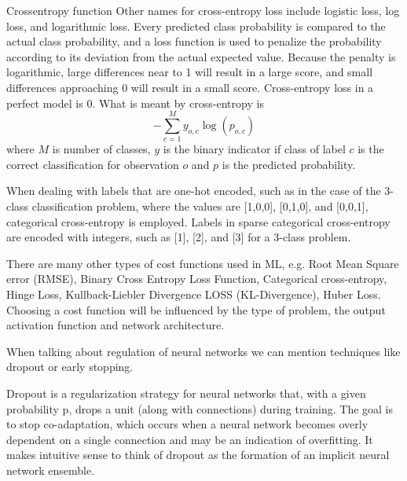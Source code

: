 Crossentropy function
Other names for cross-entropy loss include logistic loss, log loss, and logarithmic loss. Every predicted class probability is compared to the actual class probability, and a loss function is used to penalize the probability according to its deviation from the actual expected value. Because the penalty is logarithmic, large differences near to 1 will result in a large score, and small differences approaching 0 will result in a small score. Cross-entropy loss in a perfect model is 0.
What is meant by cross-entropy is 
\begin{equation}
		-\sum_{c=1}^My_{o,c}\log(p_{o,c})
\end{equation}
where $M$ is number of classes, $y$ is the binary indicator if class of label $c$ is the correct classification for observation $o$ and $p$ is the predicted probability.

When dealing with labels that are one-hot encoded, such as in the case of the 3-class classification problem, where the values are [1,0,0], [0,1,0], and [0,0,1], categorical cross-entropy is employed.
Labels in sparse categorical cross-entropy are encoded with integers, such as [1], [2], and [3] for a 3-class problem.


There are many other types of cost functions used in ML, e.g. Root Mean Square error (RMSE), Binary Cross Entropy Loss Function,  Categorical cross-entropy, Hinge Loss, Kullback-Liebler Divergence LOSS (KL-Divergence), Huber Loss. Choosing a cost function will be influenced by the type of problem, the output activation function and network architecture.


When talking about regulation of neural networks we can mention techniques like dropout or early stopping.

Dropout is a regularization strategy for neural networks that, with a given probability p, drops a unit (along with connections) during training.
The goal is to stop co-adaptation, which occurs when a neural network becomes overly dependent on a single connection and may be an indication of overfitting. It makes intuitive sense to think of dropout as the formation of an implicit neural network ensemble.

